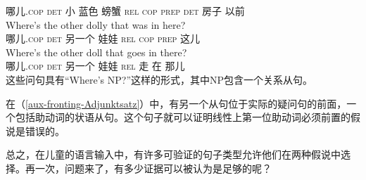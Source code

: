 哪儿.\textsc{cop} \textsc{det} 小 蓝色 螃蟹 \textsc{rel} \textsc{cop} \textsc{prep} \textsc{det} 房子 以前\\
\ex 
\gll Where's the other dolly that was in here?\\
哪儿.\textsc{cop} \textsc{det} 另一个 娃娃  \textsc{rel} \textsc{cop} \textsc{prep} 这儿\\
\ex 
\gll Where's the other doll that goes in there?\\
哪儿.\textsc{cop} \textsc{det} 另一个 娃娃 \textsc{rel} 走 在 那儿 \\
\zl
这些问句具有“Where's NP?”这样的形式，其中NP包含一个关系从句。

在（\ref{aux-fronting-Adjunktsatz}）中，有另一个从句位于实际的疑问句的前面，一个包括助动词的状语从句。这个句子就可以证明线性上第一位助动词必须前置的假说是错误的\citep[]{Sampson89a}。

总之，在儿童的语言输入中，有许多可验证的句子类型允许他们在两种假说中选择。再一次，问题来了，有多少证据可以被认为是足够的呢？


